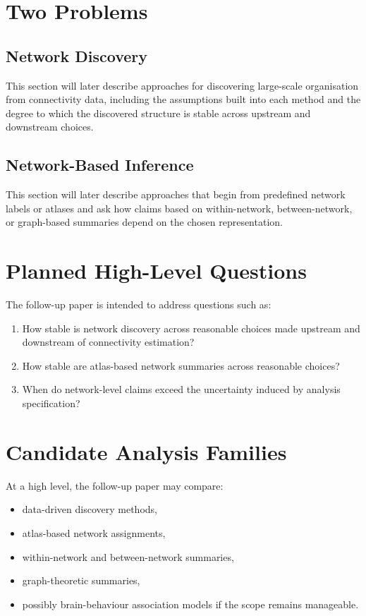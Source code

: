 \documentclass[11pt,a4paper]{article}
\begin{document}
\section{Two Problems}

\subsection{Network Discovery}

This section will later describe approaches for discovering large-scale organisation from connectivity data, including the assumptions built into each method and the degree to which the discovered structure is stable across upstream and downstream choices.

\subsection{Network-Based Inference}

This section will later describe approaches that begin from predefined network labels or atlases and ask how claims based on within-network, between-network, or graph-based summaries depend on the chosen representation.

\section{Planned High-Level Questions}

The follow-up paper is intended to address questions such as:

\begin{enumerate}[label=\arabic*.]
    \item How stable is network discovery across reasonable choices made upstream and downstream of connectivity estimation?
    \item How stable are atlas-based network summaries across reasonable choices?
    \item When do network-level claims exceed the uncertainty induced by analysis specification?
\end{enumerate}

\section{Candidate Analysis Families}

At a high level, the follow-up paper may compare:

\begin{itemize}
    \item data-driven discovery methods,
    \item atlas-based network assignments,
    \item within-network and between-network summaries,
    \item graph-theoretic summaries,
    \item possibly brain-behaviour association models if the scope remains manageable.
\end{itemize}
\end{document}
